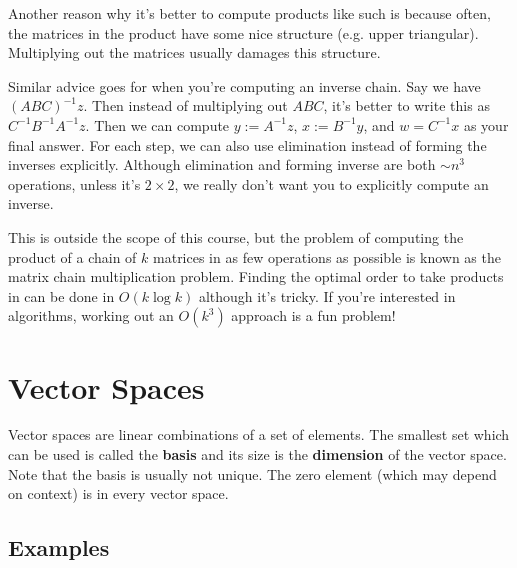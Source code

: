 \documentclass[11pt]{article}
\theoremstyle{plain} %
\theoremstyle{definition}
\theoremstyle{remark}
\begin{document}
Another reason why it's better to compute products like such is because often, the matrices in the product have some nice structure (e.g. upper triangular). Multiplying out the matrices usually damages this structure.

Similar advice goes for when you're computing an inverse chain. Say we have $(ABC)^{-1}z$. Then instead of multiplying out $ABC$, it's better to write this as $C^{-1}B^{-1}A^{-1}z$. Then we can compute $y := A^{-1}z$, $x := B^{-1}y$, and $w = C^{-1}x$ as your final answer. For each step, we can also use elimination instead of forming the inverses explicitly. Although elimination and forming inverse are both $\sim n^3$ operations, unless it's $2\times 2$, we really don't want you to explicitly compute an inverse.

This is outside the scope of this course, but the problem of computing the product of a chain of $k$ matrices in as few operations as possible is known as the matrix chain multiplication problem. Finding the optimal order to take products in can be done in $O(k \log k)$ although it's tricky. If you're interested in algorithms, working out an $O(k^3)$ approach is a fun problem!


\clearpage

\section{Vector Spaces}

Vector spaces are linear combinations of a set of elements. The smallest set which can be used is called the \textbf{basis} and its size is the \textbf{dimension} of the vector space. Note that the basis is usually not unique. The zero element (which may depend on context) is in every vector space.

\subsection{Examples}
\end{document}
